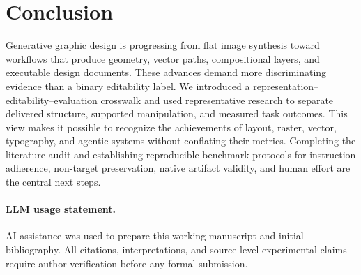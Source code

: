 \section{Conclusion}
\label{sec:conclusion}
Generative graphic design is progressing from flat image synthesis toward workflows that produce geometry, vector paths, compositional layers, and executable design documents. These advances demand more discriminating evidence than a binary editability label. We introduced a representation--editability--evaluation crosswalk and used representative research to separate delivered structure, supported manipulation, and measured task outcomes. This view makes it possible to recognize the achievements of layout, raster, vector, typography, and agentic systems without conflating their metrics. Completing the literature audit and establishing reproducible benchmark protocols for instruction adherence, non-target preservation, native artifact validity, and human effort are the central next steps.

\paragraph{LLM usage statement.}
AI assistance was used to prepare this working manuscript and initial bibliography. All citations, interpretations, and source-level experimental claims require author verification before any formal submission.
